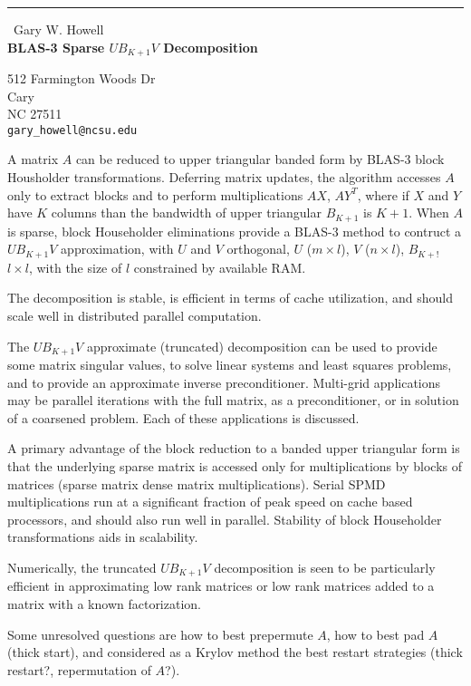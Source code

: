\documentclass{report}
\begin{document}
\begin{center}
\rule{6in}{1pt} \
{\large Gary W. Howell \\
{\bf  BLAS-3 Sparse $U B_{K+1} V$ Decomposition }}

512 Farmington Woods Dr \\ Cary \\ NC 27511
\\
{\tt gary\_howell@ncsu.edu}\end{center}



\par\vspace*{-1.0mm}\noindent
A matrix $A$ can be reduced to upper triangular banded form
by BLAS-3 block Housholder transformations. Deferring matrix updates, the
algorithm accesses $A$ only to extract blocks and to perform
multiplications $AX$, $AY^T$, where if $X$ and $Y$ have $K$ columns than
the bandwidth of upper triangular $B_{K+1}$ is $K+1$. When $A$ is sparse,
block Householder eliminations provide a BLAS-3 method to contruct a $U
B_{K+1}V$ approximation, with $U$ and $V$ orthogonal, $U$ ($m \times l$),
$V$ ($n \times l$), $B_{K+!}$ $l \times l$, with the size of $l$
constrained by available RAM.

The decomposition is stable, is efficient in terms
of cache utilization, and should scale well in distributed parallel computation.

The $U B_{K+1} V$ approximate (truncated) decomposition can be used to
provide some matrix singular values, to solve linear systems and least
squares problems, and to provide an approximate inverse preconditioner.
Multi-grid applications may be parallel iterations with the full matrix,
as a preconditioner, or in solution of a coarsened problem. Each of these
applications is discussed.

A primary advantage of the block reduction to a banded upper triangular
form is that the underlying sparse matrix is accessed only for
multiplications by blocks of matrices (sparse matrix dense matrix
multiplications). Serial SPMD multiplications run at a significant
fraction of peak speed on cache based processors, and should also run
well in parallel. Stability of block Householder transformations aids in
scalability.

Numerically, the truncated $U B_{K+1} V$ decomposition is seen to be
particularly efficient in approximating low rank matrices or low rank
matrices added to a matrix with a known factorization.

Some unresolved questions are how to best prepermute $A$, how to best pad
$A$ (thick start), and considered as a Krylov method the best restart
strategies (thick restart?, repermutation of $A$?).
\end{document}
